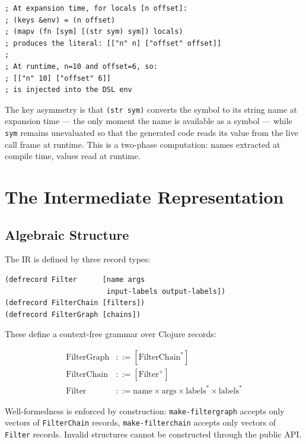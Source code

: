 \documentclass[conference]{IEEEtran}
\begin{document}
\begin{lstlisting}[caption={The locals injection mechanism}]
; At expansion time, for locals [n offset]:
; (keys &env) = (n offset)
; (mapv (fn [sym] [(str sym) sym]) locals)
; produces the literal: [["n" n] ["offset" offset]]
;
; At runtime, n=10 and offset=6, so:
; [["n" 10] ["offset" 6]]
; is injected into the DSL env
\end{lstlisting}

The key asymmetry is that \texttt{(str sym)} converts the symbol to its string name at expansion time --- the only moment the name is available as a symbol --- while \texttt{sym} remains unevaluated so that the generated code reads its value from the live call frame at runtime. This is a two-phase computation: names extracted at compile time, values read at runtime.

\section{The Intermediate Representation}

\subsection{Algebraic Structure}

The IR is defined by three record types:

\begin{lstlisting}[caption={IR record definitions}]
(defrecord Filter      [name args
                        input-labels output-labels])
(defrecord FilterChain [filters])
(defrecord FilterGraph [chains])
\end{lstlisting}

These define a context-free grammar over Clojure records:

\begin{align*}
\text{FilterGraph} &::= [\text{FilterChain}^*] \\
\text{FilterChain}  &::= [\text{Filter}^+] \\
\text{Filter}       &::= \text{name} \times \text{args} \times \text{labels}^* \times \text{labels}^*
\end{align*}

Well-formedness is enforced by construction: \texttt{make-filtergraph} accepts only vectors of \texttt{FilterChain} records, \texttt{make-filterchain} accepts only vectors of \texttt{Filter} records. Invalid structures cannot be constructed through the public API.
\end{document}
